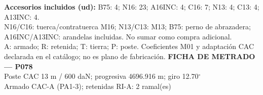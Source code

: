 \begingroup\scriptsize
\textbf{Accesorios incluidos (ud):} B75: 4; N16: 23; A16INC: 4; C16: 7; N13: 4; C13: 4; A13INC: 4.\\
N16/C16: tuerca/contratuerca M16; N13/C13: M13; B75: perno de abrazadera; A16INC/A13INC: arandelas incluidas. No sumar como compra adicional.\\
A: armado; R: retenida; T: tierra; P: poste. Coeficientes M01 y adaptación CAC declarada en el catálogo; no es plano de fabricación.
\endgroup\endgroup
\clearpage{}
\begingroup\small\setlength{\parskip}{3pt}\renewcommand{\arraystretch}{1.05}
\textbf{\large FICHA DE METRADO — P078}\\[4pt]
Poste CAC 13 m / 600 daN; progresiva 4696.916 m; giro 12.70\ensuremath{^\circ}\\
Armado CAC-A (PA1-3); retenidas RI-A: 2 ramal(es)\\
\begingroup\scriptsize
